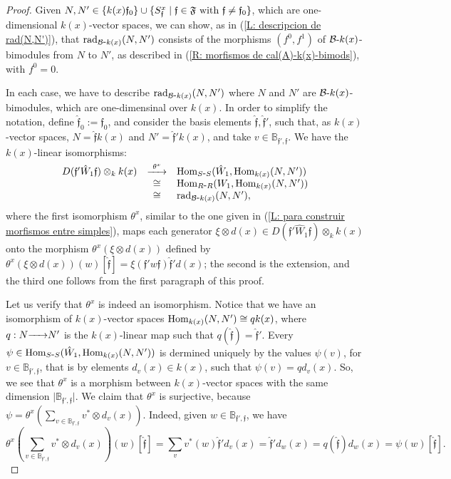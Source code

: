 \documentclass{article}
\theoremstyle{definition}
\newcommand{\Hom}{{ \rm Hom }}
\newcommand{\rad}{{ \rm rad }}
\renewcommand{\frak}{\mathfrak}
\newcommand{\g}{\hbox{-}}
\newcommand{\hueca}[1]{\mathbb{#1}}
\newcommand{\rightmap}[1]{\smash{\mathop{\hbox to 
20pt{\rightarrowfill}}\limits^{#1}}}
\begin{document}
\begin{proof}  Given 
$N,N'\in \{k(x)\frak{f}_0\}\cup\{S^x_{\frak{f}}\mid \frak{f}\in \frak{F} \hbox{ with } \frak{f}\not=\frak{f}_0 \}$, which are one-dimensional $k(x)$-vector spaces, we can show, as in (\ref{L: descripcion de rad(N,N')}), that $\rad_{{\cal B}\g k(x)}(N,N')$ consists   of the morphisms $(f^0,f^1)$ of ${\cal B}\g k(x)$-bimodules from $N$ to $N'$, as described in (\ref{R: morfismos de cal(A)-k(x)-bimods}), with $f^0=0$. 

In each case, we have to describe 
$\rad_{{\cal B}\g k(x)}(N,N')$ where  $N$ and $N'$ are ${\cal B}\g k(x)$-bimodules, which are one-dimensinal over $k(x)$. In order to simplify the  notation, define $\hat{\frak{f}}_0:=\frak{f}_0$, and consider the basis  elements 
 $\hat{\frak{f}}, \hat{\frak{f}}'$, 
 such that, as $k(x)$-vector spaces,  $N=\hat{\frak{f}}k(x)$ and 
 $N'=\hat{\frak{f}}'k(x)$, and take $v\in \hueca{B}_{\frak{f}',\frak{f}}$.  We have the $k(x)$-linear isomorphisms:
$$\begin{matrix}
D(\frak{f}'\hat{W}_1\frak{f})\otimes_kk(x)
&\rightmap{\theta^x} &
\Hom_{S\g S}(\hat{W}_1,\Hom_{k(x)}(N,N'))\hfill\\
&\cong&
\Hom_{R\g R}(W_1,\Hom_{k(x)}(N,N'))\hfill\\
&\cong&
\rad_{{\cal B}\g k(x)}(N,N'),
\hfill\\
\end{matrix}$$
where the first isomorphism $\theta^x$, similar to the one given  in (\ref{L: para construir morfismos entre simples}), maps each generator $\xi\otimes d(x)\in D(\frak{f}'\hat{W}_1\frak{f})\otimes_kk(x)$ onto the morphism 
$\theta^x(\xi\otimes d(x))$ defined by 
$\theta^x(\xi\otimes d(x))(w)[\hat{\frak{f}}]
=\xi(\frak{f}'w\frak{f})
\hat{\frak{f}}'d(x)$; the second  is the extension, and the third one follows from the first paragraph of this proof.

Let us verify that $\theta^x$ is indeed an isomorphism. Notice that we have an isomorphism of $k(x)$-vector spaces $\Hom_{k(x)}(N,N')\cong qk(x)$, where $q:N\rightmap{}N'$ is the $k(x)$-linear map such that $q(\hat{\frak{f}})=\hat{\frak{f}}'$. Every  $\psi\in \Hom_{S\g S}(\hat{W}_1,\Hom_{k(x)}(N,N'))$  is dermined uniquely by the values $\psi(v)$, for $v\in \hueca{B}_{\frak{f}',\frak{f}}$, that is by elements $d_v(x)\in k(x)$, such that $\psi(v)=qd_v(x)$. So, we see that $\theta^x$ is a morphism between $k(x)$-vector spaces with the same dimension $\vert 
\hueca{B}_{\frak{f}',\frak{f}}\vert$.  We claim that $\theta^x$ is surjective, because  
$\psi=\theta^x(
\sum_{v\in \hueca{B}_{\frak{f}',\frak{f}}}v^*\otimes d_v(x))$. Indeed, given $w\in \hueca{B}_{\frak{f}',\frak{f}}$, we have 
$$\theta^x(
\sum_{v\in \hueca{B}_{\frak{f}',\frak{f}}}v^*\otimes d_v(x))(w)[\hat{\frak{f}}]=
\sum_v v^*(w)\hat{\frak{f}}'d_v(x)
=\hat{\frak{f}}'d_w(x)
=q(\hat{\frak{f}})d_w(x)=\psi(w)[\hat{\frak{f}}].$$



\end{proof}
\end{document}

